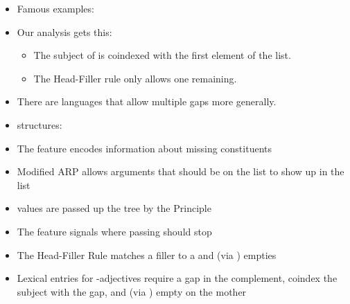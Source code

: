 \documentclass[a4paper,landscape,headrule,footrule]{foils}
\begin{document}
\begin{itemize}
\item Famous examples:
  \begin{exe}
    \ex {}
    \ex {}
  \end{exe}
\item Our analysis gets this:
  \begin{itemize}
  \item The subject of  is coindexed with the first
    element of the  list.
  \item The Head-Filler rule only allows one 
    remaining.
  \end{itemize}
\item There are languages that allow multiple gaps more
generally.
\end{itemize}


\begin{itemize}
\item {} structures:
  \begin{exe}
   \ex {}
   \ex {}
 \end{exe}
\item The feature  encodes information about
missing constituents
\item Modified ARP allows arguments that should be on
the  list to show up in the  list
\item {} values are passed up the tree by the 
Principle
\newpage
\item The feature  signals where  passing
should stop
\item The Head-Filler Rule matches a filler to a  and
(via ) empties 
\item Lexical entries for -adjectives require a gap in
the complement, coindex the subject with the gap,
and (via ) empty  on the mother
\end{itemize}

\end{document}
